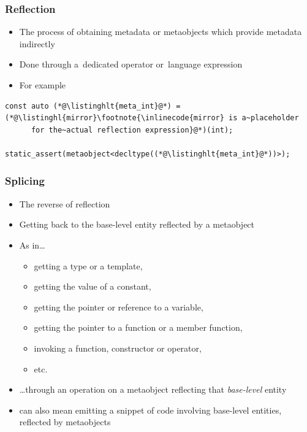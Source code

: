 \documentclass[aspectratio=169,compress,table,xcolor=table]{beamer}
\begin{document}
\begin{frame}[fragile]
  \frametitle{Reflection}
  \larger
  \begin{itemize}
    \item The process of obtaining metadata or metaobjects which provide metadata
      indirectly
    \item Done through a~dedicated operator or~language expression
    \item For example
  \end{itemize}
  \begin{lstlisting}[language=c++2x,basicstyle=\large\ttfamily]
const auto (*@\listinghlt{meta_int}@*) = (*@\listinghl{mirror}\footnote{\inlinecode{mirror} is a~placeholder
      for the~actual reflection expression}@*)(int);

static_assert(metaobject<decltype((*@\listinghlt{meta_int}@*))>);
  \end{lstlisting}
\end{frame}
\begin{frame}
  \frametitle{Splicing}
  \larger
  \begin{itemize}
    \item The reverse of reflection
    \item Getting back to the base-level entity reflected by a metaobject
    \item As in\ldots
    \begin{itemize}
      \smaller
      \item getting a type or a template,
      \item getting the value of a constant,
      \item getting the pointer or reference to a variable,
      \item getting the pointer to a function or a member function,
      \item invoking a function, constructor or operator,
      \item etc.
    \end{itemize}
    \item \ldots through an operation on a metaobject reflecting that
      {\em base-level} entity
    \item {} can also mean emitting a snippet of code involving
      base-level entities, reflected by metaobjects
  \end{itemize}
\end{frame}
\end{document}
